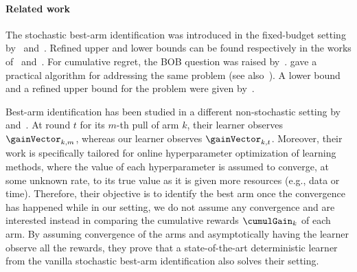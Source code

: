 \paragraph{Related work} The stochastic best-arm identification was introduced in 
the fixed-budget setting by~\cite{Bubeck09PE} and~\cite{Audibert10BA}.
Refined upper and lower bounds 
can be found respectively in the works of~\cite{Karnin13AO} and~\cite{Carpentier16TB}. 
For cumulative regret, the BOB
question was raised by~\cite{Bubeck12BB}. \cite{Seldin14OP} 
gave a practical algorithm for addressing the same problem 
(see also~\citealp{Seldin17IP}). A lower bound and a refined upper bound for the 
problem were given by~\cite{Auer16AA}.

Best-arm identification has been studied in a different
non-stochastic setting by~\cite{Jamieson16NS} and~\cite{Li16HA}. 
At round $t$ for its $m$-th pull of arm $k$, 
their learner observes $\gainVector_{k,m}$, whereas
our learner  observes $\gainVector_{k,t}$.
Moreover, their work %
is specifically tailored for online hyperparameter 
optimization of learning methods, where the value of each 
hyperparameter is assumed to converge, at some unknown rate, 
to its true value as it is given more resources (e.g., data or time). 
Therefore, their objective is to identify the best arm once the 
convergence has happened while in our setting, we do not assume 
any convergence and are interested instead in comparing the 
cumulative rewards $\cumulGain_k$ of each arm. By assuming 
convergence of the arms and asymptotically having the learner 
observe all the rewards, they prove that a state-of-the-art deterministic learner from the vanilla stochastic best-arm identification also solves their setting.



